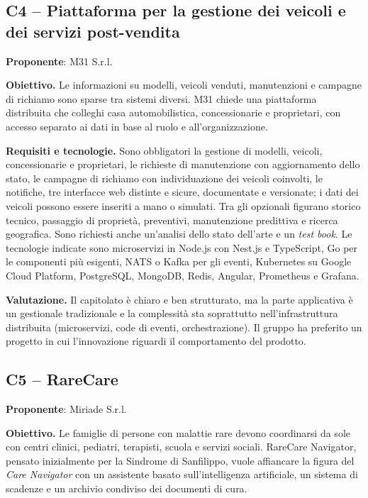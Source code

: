 \subsection{C4 -- Piattaforma per la gestione dei veicoli e dei servizi post-vendita}
\textbf{Proponente}: M31 S.r.l.

\textbf{Obiettivo.} Le informazioni su modelli, veicoli venduti,
manutenzioni e campagne di richiamo sono sparse tra sistemi diversi. M31
chiede una piattaforma distribuita che colleghi casa automobilistica,
concessionarie e proprietari, con accesso separato ai dati in base al ruolo
e all'organizzazione.

\textbf{Requisiti e tecnologie.} Sono obbligatori la gestione di modelli,
veicoli, concessionarie e proprietari, le richieste di manutenzione con
aggiornamento dello stato, le campagne di richiamo con individuazione dei
veicoli coinvolti, le notifiche, tre interfacce web distinte e 
sicure, documentate e versionate; i dati dei veicoli possono essere
inseriti a mano o simulati. Tra gli opzionali figurano storico tecnico,
passaggio di proprietà, preventivi, manutenzione predittiva e ricerca
geografica. Sono richiesti anche un'analisi dello stato dell'arte e un
\emph{test book}. Le tecnologie indicate sono microservizi in Node.js con
Nest.js e TypeScript, Go per le componenti più esigenti, NATS o Kafka per
gli eventi, Kubernetes su Google Cloud Platform, PostgreSQL, MongoDB,
Redis, Angular, Prometheus e Grafana.

\textbf{Valutazione.} Il capitolato è chiaro e ben strutturato, ma la parte
applicativa è un gestionale tradizionale e la complessità sta soprattutto
nell'infrastruttura distribuita (microservizi, code di eventi,
orchestrazione). Il gruppo ha preferito un progetto in cui l'innovazione
riguardi il comportamento del prodotto.

\subsection{C5 -- RareCare}
\textbf{Proponente}: Miriade S.r.l.

\textbf{Obiettivo.} Le famiglie di persone con malattie rare devono
coordinarsi da sole con centri clinici, pediatri, terapisti, scuola e
servizi sociali. RareCare Navigator, pensato inizialmente per la Sindrome
di Sanfilippo, vuole affiancare la figura del \emph{Care Navigator} con un
assistente basato sull'intelligenza artificiale, un sistema di scadenze e
un archivio condiviso dei documenti di cura.

